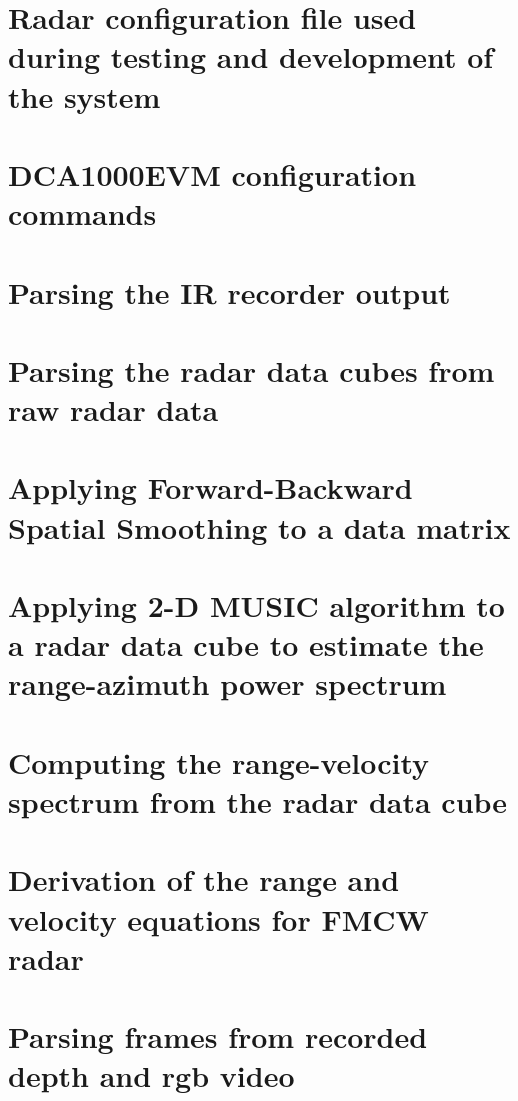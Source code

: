 \documentclass[english, numeric, fleqn, draft]{tauthesis}
\begin{document}
\begin{appendices}

\chapter{Radar configuration file used during testing and development of the system}
\label{app:config}


\chapter{DCA1000EVM configuration commands}
\label{app:dca1000evm-commands}


\chapter{Parsing the IR recorder output}
\label{app:ir-parsing}


\chapter{Parsing the radar data cubes from raw radar data}
\label{app:get_frames}


\chapter{Applying Forward-Backward Spatial Smoothing to a data matrix}
\label{app:fbss-algorithm}


\chapter{Applying 2-D MUSIC algorithm to a radar data cube to estimate the range-azimuth power spectrum}
\label{app:2d-music-algorithm}


\chapter{Computing the range-velocity spectrum from the radar data cube}
\label{app:2dfft-range-velocity-example}


\chapter{Derivation of the range and velocity equations for FMCW radar}
\label{app:deriving-range-velocity-fft}


\chapter{Parsing frames from recorded depth and rgb video}
\label{app:image-parsing}


\label{app:mic-parsing}


\end{appendices}
\end{document}
